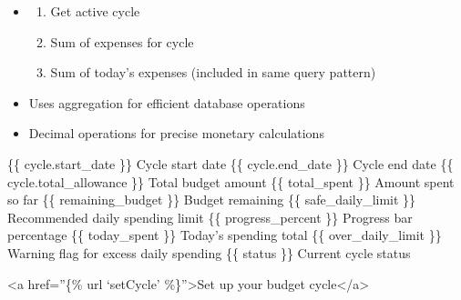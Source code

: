 \documentclass[letterpaper,10pt,english]{sphinxmanual}
\begin{document}
\begin{fulllineitems}
\begin{description}
\begin{itemize}
\end{itemize}

\begin{itemize}
\item {} \begin{description}
\begin{enumerate}
%
\item {} 
\sphinxAtStartPar
Get active cycle

\item {} 
\sphinxAtStartPar
Sum of expenses for cycle

\item {} 
\sphinxAtStartPar
Sum of today’s expenses (included in same query pattern)

\end{enumerate}

\end{description}

\item {} 
\sphinxAtStartPar
Uses aggregation for efficient database operations

\item {} 
\sphinxAtStartPar
Decimal operations for precise monetary calculations

\end{itemize}

\sphinxAtStartPar
\{\{ cycle.start\_date \}\} \sphinxhyphen{} Cycle start date
\{\{ cycle.end\_date \}\} \sphinxhyphen{} Cycle end date
\{\{ cycle.total\_allowance \}\} \sphinxhyphen{} Total budget amount
\{\{ total\_spent \}\} \sphinxhyphen{} Amount spent so far
\{\{ remaining\_budget \}\} \sphinxhyphen{} Budget remaining
\{\{ safe\_daily\_limit \}\} \sphinxhyphen{} Recommended daily spending limit
\{\{ progress\_percent \}\} \sphinxhyphen{} Progress bar percentage
\{\{ today\_spent \}\} \sphinxhyphen{} Today’s spending total
\{\{ over\_daily\_limit \}\} \sphinxhyphen{} Warning flag for excess daily spending
\{\{ status \}\} \sphinxhyphen{} Current cycle status

\begin{description}
\sphinxAtStartPar
\textless{}a href=”\{\% url ‘setCycle’ \%\}”\textgreater{}Set up your budget cycle\textless{}/a\textgreater{}

\end{description}


\end{description}
\end{fulllineitems}
\end{document}
